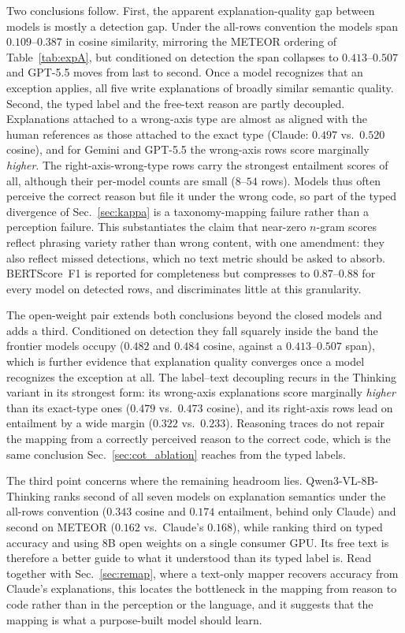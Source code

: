 \documentclass[runningheads]{llncs}
\begin{document}
Two conclusions follow.
First, the apparent explanation-quality gap between models is mostly a detection gap.
Under the all-rows convention the models span $0.109$--$0.387$ in cosine similarity, mirroring the METEOR ordering of Table~\ref{tab:expA}, but conditioned on detection the span collapses to $0.413$--$0.507$ and GPT-5.5 moves from last to second.
Once a model recognizes that an exception applies, all five write explanations of broadly similar semantic quality.
Second, the typed label and the free-text reason are partly decoupled.
Explanations attached to a wrong-axis type are almost as aligned with the human references as those attached to the exact type (Claude: $0.497$ vs.\ $0.520$ cosine), and for Gemini and GPT-5.5 the wrong-axis rows score marginally \emph{higher}.
The right-axis-wrong-type rows carry the strongest entailment scores of all, although their per-model counts are small ($8$--$54$ rows).
Models thus often perceive the correct reason but file it under the wrong code, so part of the typed divergence of Sec.~\ref{sec:kappa} is a taxonomy-mapping failure rather than a perception failure.
This substantiates the claim that near-zero $n$-gram scores reflect phrasing variety rather than wrong content, with one amendment: they also reflect missed detections, which no text metric should be asked to absorb.
BERTScore~F1 is reported for completeness but compresses to $0.87$--$0.88$ for every model on detected rows, and discriminates little at this granularity.

The open-weight pair extends both conclusions beyond the closed models and adds a third.
Conditioned on detection they fall squarely inside the band the frontier models occupy ($0.482$ and $0.484$ cosine, against a $0.413$--$0.507$ span), which is further evidence that explanation quality converges once a model recognizes the exception at all.
The label--text decoupling recurs in the Thinking variant in its strongest form: its wrong-axis explanations score marginally \emph{higher} than its exact-type ones ($0.479$ vs.\ $0.473$ cosine), and its right-axis rows lead on entailment by a wide margin ($0.322$ vs.\ $0.233$).
Reasoning traces do not repair the mapping from a correctly perceived reason to the correct code, which is the same conclusion Sec.~\ref{sec:cot_ablation} reaches from the typed labels.

The third point concerns where the remaining headroom lies.
Qwen3-VL-8B-Thinking ranks second of all seven models on explanation semantics under the all-rows convention ($0.343$ cosine and $0.174$ entailment, behind only Claude) and second on METEOR ($0.162$ vs.\ Claude's $0.168$), while ranking third on typed accuracy and using $8$B open weights on a single consumer GPU.
Its free text is therefore a better guide to what it understood than its typed label is.
Read together with Sec.~\ref{sec:remap}, where a text-only mapper recovers accuracy from Claude's explanations, this locates the bottleneck in the mapping from reason to code rather than in the perception or the language, and it suggests that the mapping is what a purpose-built model should learn.
\end{document}
